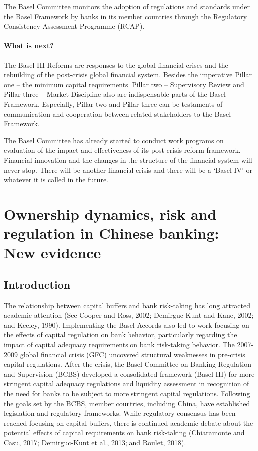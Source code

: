 \documentclass[
  12pt,
  a4paper,
]{scrreprt}
\begin{document}
The Basel Committee monitors the adoption of regulations and standards
under the Basel Framework by banks in its member countries through the
Regulatory Consistency Assessment Programme (RCAP).

\subsubsection{What is next?}\label{what-is-next}

The Basel III Reforms are responses to the global financial crises and
the rebuilding of the post-crisis global financial system. Besides the
imperative Pillar one -- the minimum capital requirements, Pillar two --
Supervisory Review and Pillar three -- Market Discipline also are
indispensable parts of the Basel Framework. Especially, Pillar two and
Pillar three can be testaments of communication and cooperation between
related stakeholders to the Basel Framework.

The Basel Committee has already started to conduct work programs on
evaluation of the impact and effectiveness of its post-crisis reform
framework. Financial innovation and the changes in the structure of the
financial system will never stop. There will be another financial crisis
and there will be a `Basel IV' or whatever it is called in the future.


\chapter{Ownership dynamics, risk and regulation in Chinese banking: New
evidence}\label{ownership-dynamics-risk-and-regulation-in-chinese-banking-new-evidence}

\section{Introduction}\label{introduction-1}

The relationship between capital buffers and bank risk-taking has long
attracted academic attention (See Cooper and Ross, 2002; Demirguc-Kunt
and Kane, 2002; and Keeley, 1990). Implementing the Basel Accords also
led to work focusing on the effects of capital regulation on bank
behavior, particularly regarding the impact of capital adequacy
requirements on bank risk-taking behavior. The 2007-2009 global
financial crisis (GFC) uncovered structural weaknesses in pre-crisis
capital regulations. After the crisis, the Basel Committee on Banking
Regulation and Supervision (BCBS) developed a consolidated framework
(Basel III) for more stringent capital adequacy regulations and
liquidity assessment in recognition of the need for banks to be subject
to more stringent capital regulations. Following the goals set by the
BCBS, member countries, including China, have established legislation
and regulatory frameworks. While regulatory consensus has been reached
focusing on capital buffers, there is continued academic debate about
the potential effects of capital requirements on bank risk-taking
(Chiaramonte and Casu, 2017; Demirguc-Kunt et al., 2013; and Roulet,
2018).
\end{document}
